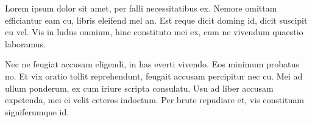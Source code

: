 \label{chapter:results}

Lorem ipsum dolor sit amet, per falli necessitatibus ex. Nemore omittam efficiantur eam cu, libris eleifend mel an. Est reque dicit doming id, dicit suscipit cu vel. Vis in ludus omnium, hinc constituto mei ex, cum ne vivendum quaestio laboramus.

Nec ne feugiat accusam eligendi, in has everti vivendo. Eos minimum probatus no. Et vix oratio tollit reprehendunt, feugait accusam percipitur nec cu. Mei ad ullum ponderum, ex cum iriure scripta consulatu. Usu ad liber accusam expetenda, mei ei velit ceteros indoctum. Per brute repudiare et, vis constituam signiferumque id.


\clearpage


